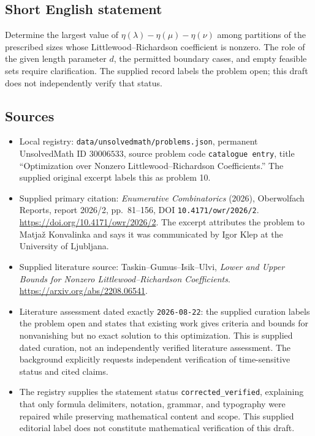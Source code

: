 \documentclass[11pt]{article}
\begin{document}
\subsection{Short English statement}
Determine the largest value of \(\eta(\lambda)-\eta(\mu)-\eta(\nu)\) among partitions of the prescribed sizes whose Littlewood--Richardson coefficient is nonzero. The role of the given length parameter \(d\), the permitted boundary cases, and empty feasible sets require clarification. The supplied record labels the problem open; this draft does not independently verify that status.
\subsection{Sources}
\begin{itemize}
\item Local registry: \texttt{data/unsolvedmath/problems.json}, permanent UnsolvedMath ID \(30006533\), source problem code \texttt{catalogue entry}, title ``Optimization over Nonzero Littlewood--Richardson Coefficients.'' The supplied original excerpt labels this as problem 10.
\item Supplied primary citation: \emph{Enumerative Combinatorics} (2026), Oberwolfach Reports, report 2026/2, pp.~81--156, DOI \texttt{10.4171/owr/2026/2}. \url{https://doi.org/10.4171/owr/2026/2}. The excerpt attributes the problem to Matja\v{z} Konvalinka and says it was communicated by Igor Klep at the University of Ljubljana.
\item Supplied literature source: Taskin--Gumus--Isik--Ulvi, \emph{Lower and Upper Bounds for Nonzero Littlewood--Richardson Coefficients}. \url{https://arxiv.org/abs/2208.06541}.
\item Literature assessment dated exactly \texttt{2026-08-22}: the supplied curation labels the problem open and states that existing work gives criteria and bounds for nonvanishing but no exact solution to this optimization. This is supplied dated curation, not an independently verified literature assessment. The background explicitly requests independent verification of time-sensitive status and cited claims.
\item The registry supplies the statement status \texttt{corrected\_verified}, explaining that only formula delimiters, notation, grammar, and typography were repaired while preserving mathematical content and scope. This supplied editorial label does not constitute mathematical verification of this draft.
\end{itemize}
\end{document}
